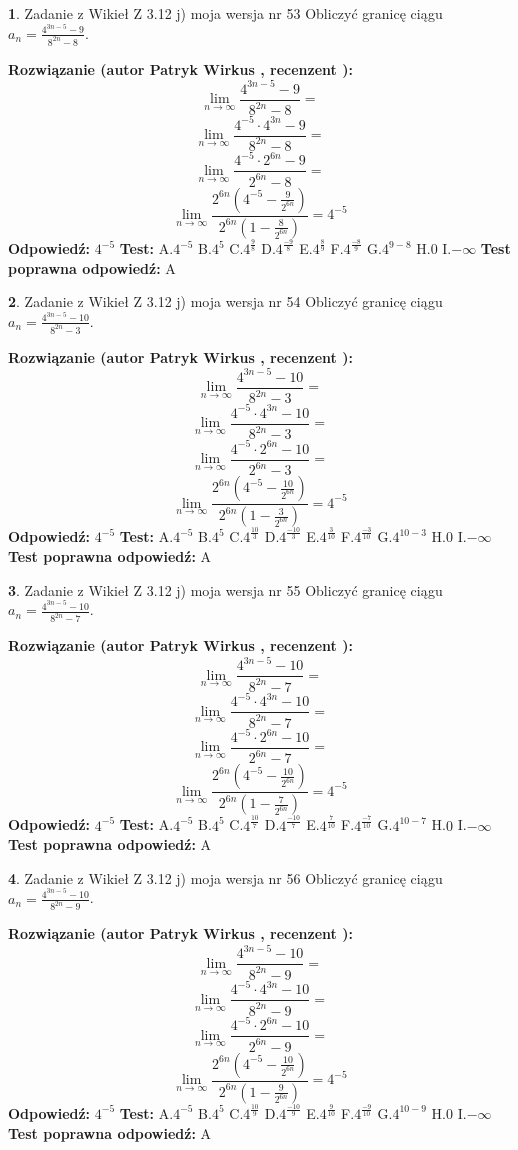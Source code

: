 \documentclass[12pt, a4paper]{article}
\theoremstyle{definition} %
\newtheorem{zad}{}
\newcommand{\zadStart}[1]{\begin{zad}#1\newline}
\newcommand{\zadStop}{\end{zad}}
\newcommand{\rozwStart}[2]{\noindent \textbf{Rozwiązanie (autor #1 , recenzent #2): }\newline}
\newcommand{\rozwStop}{\newline}
\newcommand{\odpStart}{\noindent \textbf{Odpowiedź:}\newline}
\newcommand{\odpStop}{\newline}
\newcommand{\testStart}{\noindent \textbf{Test:}\newline}
\newcommand{\testStop}{\newline}
\newcommand{\kluczStart}{\noindent \textbf{Test poprawna odpowiedź:}\newline}
\newcommand{\kluczStop}{\newline}
\begin{document}
\zadStart{Zadanie z Wikieł Z 3.12 j) moja wersja nr 53}
Obliczyć granicę ciągu $a_{n}=\frac{4^{3n-5}-9}{8^{2n}-8}$.
\zadStop
\rozwStart{Patryk Wirkus}{}
$$\lim\limits_{n\to\infty}\frac{4^{3n-5}-9}{8^{2n}-8}=$$
$$\lim\limits_{n\to\infty}\frac{4^{-5} \cdot 4^{3n}-9}{8^{2n}-8}=$$
$$\lim\limits_{n\to\infty}\frac{4^{-5} \cdot 2^{6n}-9}{2^{6n}-8}=$$
$$\lim\limits_{n\to\infty}\frac{2^{6n}(4^{-5} - \frac{9}{2^{6n}})}{2^{6n}(1-\frac{8}{2^{6n}})}= 4^{-5}$$
\rozwStop
\odpStart
$4^{-5}$
\odpStop
\testStart
A.$4^{-5}$
B.$4^{5}$
C.$4^{\frac{9}{8}}$
D.$4^{\frac{-9}{8}}$
E.$4^{\frac{8}{9}}$
F.$4^{\frac{-8}{9}}$
G.$4^{9-8}$
H.$0$
I.$-\infty$
\testStop
\kluczStart
A
\kluczStop



\zadStart{Zadanie z Wikieł Z 3.12 j) moja wersja nr 54}
Obliczyć granicę ciągu $a_{n}=\frac{4^{3n-5}-10}{8^{2n}-3}$.
\zadStop
\rozwStart{Patryk Wirkus}{}
$$\lim\limits_{n\to\infty}\frac{4^{3n-5}-10}{8^{2n}-3}=$$
$$\lim\limits_{n\to\infty}\frac{4^{-5} \cdot 4^{3n}-10}{8^{2n}-3}=$$
$$\lim\limits_{n\to\infty}\frac{4^{-5} \cdot 2^{6n}-10}{2^{6n}-3}=$$
$$\lim\limits_{n\to\infty}\frac{2^{6n}(4^{-5} - \frac{10}{2^{6n}})}{2^{6n}(1-\frac{3}{2^{6n}})}= 4^{-5}$$
\rozwStop
\odpStart
$4^{-5}$
\odpStop
\testStart
A.$4^{-5}$
B.$4^{5}$
C.$4^{\frac{10}{3}}$
D.$4^{\frac{-10}{3}}$
E.$4^{\frac{3}{10}}$
F.$4^{\frac{-3}{10}}$
G.$4^{10-3}$
H.$0$
I.$-\infty$
\testStop
\kluczStart
A
\kluczStop



\zadStart{Zadanie z Wikieł Z 3.12 j) moja wersja nr 55}
Obliczyć granicę ciągu $a_{n}=\frac{4^{3n-5}-10}{8^{2n}-7}$.
\zadStop
\rozwStart{Patryk Wirkus}{}
$$\lim\limits_{n\to\infty}\frac{4^{3n-5}-10}{8^{2n}-7}=$$
$$\lim\limits_{n\to\infty}\frac{4^{-5} \cdot 4^{3n}-10}{8^{2n}-7}=$$
$$\lim\limits_{n\to\infty}\frac{4^{-5} \cdot 2^{6n}-10}{2^{6n}-7}=$$
$$\lim\limits_{n\to\infty}\frac{2^{6n}(4^{-5} - \frac{10}{2^{6n}})}{2^{6n}(1-\frac{7}{2^{6n}})}= 4^{-5}$$
\rozwStop
\odpStart
$4^{-5}$
\odpStop
\testStart
A.$4^{-5}$
B.$4^{5}$
C.$4^{\frac{10}{7}}$
D.$4^{\frac{-10}{7}}$
E.$4^{\frac{7}{10}}$
F.$4^{\frac{-7}{10}}$
G.$4^{10-7}$
H.$0$
I.$-\infty$
\testStop
\kluczStart
A
\kluczStop



\zadStart{Zadanie z Wikieł Z 3.12 j) moja wersja nr 56}
Obliczyć granicę ciągu $a_{n}=\frac{4^{3n-5}-10}{8^{2n}-9}$.
\zadStop
\rozwStart{Patryk Wirkus}{}
$$\lim\limits_{n\to\infty}\frac{4^{3n-5}-10}{8^{2n}-9}=$$
$$\lim\limits_{n\to\infty}\frac{4^{-5} \cdot 4^{3n}-10}{8^{2n}-9}=$$
$$\lim\limits_{n\to\infty}\frac{4^{-5} \cdot 2^{6n}-10}{2^{6n}-9}=$$
$$\lim\limits_{n\to\infty}\frac{2^{6n}(4^{-5} - \frac{10}{2^{6n}})}{2^{6n}(1-\frac{9}{2^{6n}})}= 4^{-5}$$
\rozwStop
\odpStart
$4^{-5}$
\odpStop
\testStart
A.$4^{-5}$
B.$4^{5}$
C.$4^{\frac{10}{9}}$
D.$4^{\frac{-10}{9}}$
E.$4^{\frac{9}{10}}$
F.$4^{\frac{-9}{10}}$
G.$4^{10-9}$
H.$0$
I.$-\infty$
\testStop
\kluczStart
A
\kluczStop
\end{document}
